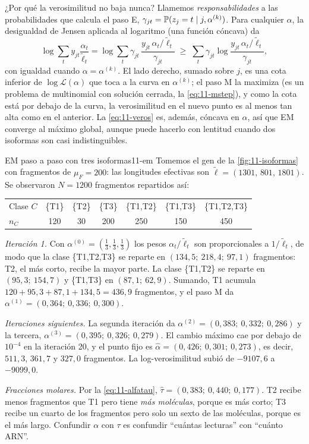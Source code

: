 ¿Por qué la verosimilitud no baja nunca? Llamemos \emph{responsabilidades} a las probabilidades que calcula el paso E, $\gamma_{jt}=\mathbb{P}(z_j=t\mid j,\alpha^{(k)})$. Para cualquier $\alpha$, la desigualdad de Jensen aplicada al logaritmo (una función cóncava) da
\begin{equation}\label{eq:11-jensen}
\log\sum_t y_{jt}\frac{\alpha_t}{\tilde\ell_t}
=\log\sum_t \gamma_{jt}\,\frac{y_{jt}\,\alpha_t/\tilde\ell_t}{\gamma_{jt}}
\;\ge\;\sum_t\gamma_{jt}\log\frac{y_{jt}\,\alpha_t/\tilde\ell_t}{\gamma_{jt}},
\end{equation}
con igualdad cuando $\alpha=\alpha^{(k)}$. El lado derecho, sumado sobre $j$, es una cota inferior de $\log\mathcal L(\alpha)$ que toca a la curva en $\alpha^{(k)}$; el paso M la maximiza (es un problema de multinomial con solución cerrada, la \cref{eq:11-mstep}), y como la cota está por debajo de la curva, la verosimilitud en el nuevo punto es al menos tan alta como en el anterior. La \cref{eq:11-veros} es, además, cóncava en $\alpha$, así que EM converge al máximo global, aunque puede hacerlo con lentitud cuando dos isoformas son casi indistinguibles.

\begin{ejemplo}{EM paso a paso con tres isoformas}{11-em}
Tomemos el gen de la \cref{fig:11-isoformas} con fragmentos de $\mu_F=200$: las longitudes efectivas son $\tilde\ell=(1301,\,801,\,1801)$. Se observaron $N=1200$ fragmentos repartidos así:
\begin{center}\small
\begin{tabular}{@{}lcccccc@{}}
\toprule
Clase $C$ & \{T1\} & \{T2\} & \{T3\} & \{T1,T2\} & \{T1,T3\} & \{T1,T2,T3\}\\
$n_C$ & 120 & 30 & 200 & 250 & 150 & 450\\
\bottomrule
\end{tabular}
\end{center}
\emph{Iteración 1.} Con $\alpha^{(0)}=(\tfrac13,\tfrac13,\tfrac13)$ los pesos $\alpha_t/\tilde\ell_t$ son proporcionales a $1/\tilde\ell_t$, de modo que la clase \{T1,T2,T3\} se reparte en $(134{,}5;\ 218{,}4;\ 97{,}1)$ fragmentos: T2, el más corto, recibe la mayor parte. La clase \{T1,T2\} se reparte en $(95{,}3;\ 154{,}7)$ y \{T1,T3\} en $(87{,}1;\ 62{,}9)$. Sumando, T1 acumula $120+95{,}3+87{,}1+134{,}5=436{,}9$ fragmentos, y el paso M da $\alpha^{(1)}=(0{,}364;\ 0{,}336;\ 0{,}300)$.

\emph{Iteraciones siguientes.} La segunda iteración da $\alpha^{(2)}=(0{,}383;\ 0{,}332;\ 0{,}286)$ y la tercera, $\alpha^{(3)}=(0{,}395;\ 0{,}326;\ 0{,}279)$. El cambio máximo cae por debajo de $10^{-4}$ en la iteración 20, y el punto fijo es $\hat\alpha=(0{,}426;\ 0{,}301;\ 0{,}273)$, es decir, $511{,}3$, $361{,}7$ y $327{,}0$ fragmentos. La log-verosimilitud subió de $-9107{,}6$ a $-9099{,}0$.

\emph{Fracciones molares.} Por la \cref{eq:11-alfatau}, $\hat\tau=(0{,}383;\ 0{,}440;\ 0{,}177)$. T2 recibe menos fragmentos que T1 pero tiene \emph{más moléculas}, porque es más corto; T3 recibe un cuarto de los fragmentos pero solo un sexto de las moléculas, porque es el más largo. Confundir $\alpha$ con $\tau$ es confundir ``cuántas lecturas'' con ``cuánto ARN''.
\end{ejemplo}

